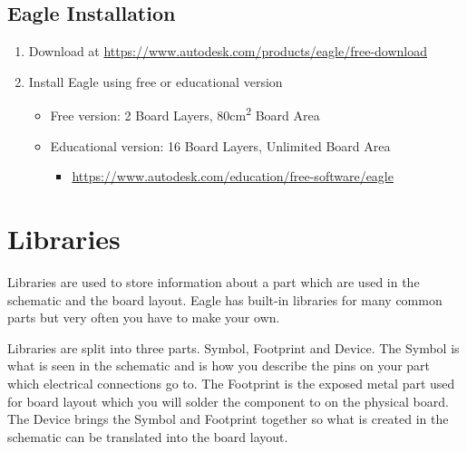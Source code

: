 \documentclass{article}
\begin{document}
\subsection{Eagle Installation}
\begin{enumerate}
    \item Download at \url{https://www.autodesk.com/products/eagle/free-download}
    \item Install Eagle using free or educational version
    \begin{itemize}
        \item Free version: 2 Board Layers, 80cm\textsuperscript{2} Board Area
        \item Educational version: 16 Board Layers, Unlimited Board Area
        \begin{itemize}
            \item \url{https://www.autodesk.com/education/free-software/eagle}
        \end{itemize}
    \end{itemize}
\end{enumerate}

\section{Libraries}
Libraries are used to store information about a part which are used in the schematic and the board layout. Eagle has built-in libraries for many common parts but very often you have to make your own. \par
Libraries are split into three parts. Symbol, Footprint and Device. The Symbol is what is seen in the schematic and is how you describe the pins on your part which electrical connections go to. The Footprint is the exposed metal part used for board layout which you will solder the component to on the physical board. The Device brings the Symbol and Footprint together so what is created in the schematic can be translated into the board layout.
\end{document}
